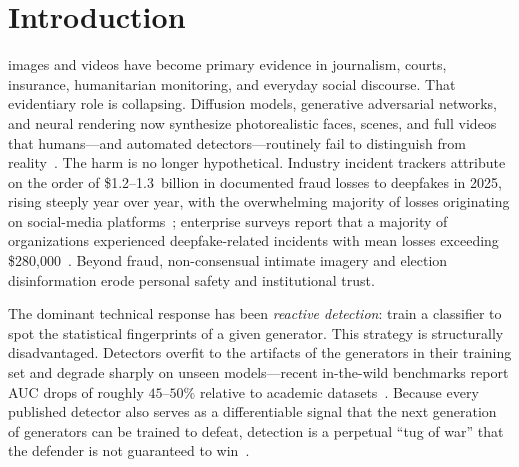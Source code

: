 \documentclass[journal]{IEEEtran}
\begin{document}
\section{Introduction}
 images and videos have become primary evidence in
journalism, courts, insurance, humanitarian monitoring, and everyday social
discourse. That evidentiary role is collapsing. Diffusion models, generative
adversarial networks, and neural rendering now synthesize photorealistic faces,
scenes, and full videos that humans---and automated detectors---routinely fail
to distinguish from reality~\cite{croitoru2024deepfake,verdoliva2020media}. The
harm is no longer hypothetical. Industry incident trackers attribute on the
order of \$1.2--1.3~billion in documented fraud losses to deepfakes in 2025,
rising steeply year over year, with the overwhelming majority of losses
originating on social-media platforms~\cite{resemble2025threat,surfshark2025fraud};
enterprise surveys report that a majority of organizations experienced
deepfake-related incidents with mean losses exceeding
\$280{,}000~\cite{ironscales2025}. Beyond fraud, non-consensual intimate
imagery and election disinformation erode personal safety and institutional
trust.

The dominant technical response has been \emph{reactive detection}: train a
classifier to spot the statistical fingerprints of a given generator. This
strategy is structurally disadvantaged. Detectors overfit to the artifacts of
the generators in their training set and degrade sharply on unseen
models---recent in-the-wild benchmarks report AUC drops of roughly
$45$--$50\%$ relative to academic
datasets~\cite{chandra2025deepfakeeval,croitoru2024deepfake}. Because every
published detector also serves as a differentiable signal that the next
generation of generators can be trained to defeat, detection is a perpetual
``tug of war'' that the defender is not guaranteed to
win~\cite{tugofwar2024,deepfakevideo2024review}.
\end{document}

